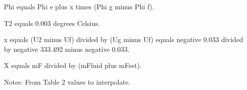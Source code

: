 Phi equals Phi e plus x times (Phi g minus Phi f).  

T2 equals 0.003 degrees Celsius.  

x equals (U2 minus Uf) divided by (Ug minus Uf) equals negative 0.033 divided by negative 333.492 minus negative 0.033.  

X equals mF divided by (mFluid plus mFest).  

Notes:  
From Table 2 values to interpolate.